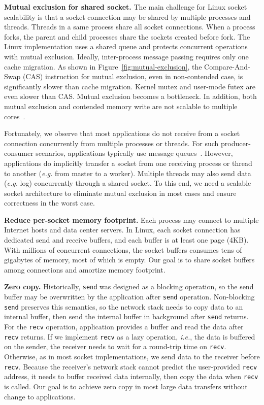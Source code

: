 \textbf{Mutual exclusion for shared socket.}
The main challenge for Linux socket scalability is that a socket connection may be shared by multiple processes and threads. Threads in a same process share all socket connections. When a process forks, the parent and child processes share the sockets created before fork. The Linux implementation uses a shared queue and protects concurrent operations with mutual exclusion.
Ideally, inter-process message passing requires only one cache migration. As shown in Figure~\ref{fig:mutual-exclusion}, the Compare-And-Swap (CAS) instruction for mutual exclusion, even in non-contended case, is significantly slower than cache migration. Kernel mutex and user-mode futex are even slower than CAS. Mutual exclusion becomes a bottleneck. In addition, both mutual exclusion and contended memory write are not scalable to multiple cores~\cite{boyd2014optimizing}.

Fortunately, we observe that most applications do not receive from a socket connection concurrently from multiple processes or threads. For such producer-consumer scenarios, applications typically use message queues~\cite{hintjens2013zeromq}. However, applications do implicitly transfer a socket from one receiving process or thread to another (\textit{e.g.} from master to a worker). Multiple threads may also send data (\textit{e.g.} log) concurrently through a shared socket.
To this end, we need a scalable socket architecture to eliminate mutual exclusion in most cases and ensure correctness in the worst case.


\textbf{Reduce per-socket memory footprint.}
Each process may connect to multiple Internet hosts and data center servers. In Linux, each socket connection has dedicated send and receive buffers, and each buffer is at least one page (4KB). With millions of concurrent connections, the socket buffers consumes tens of gigabytes of memory, most of which is empty. Our goal is to share socket buffers among connections and amortize memory footprint.


\textbf{Zero copy.}
Historically, \texttt{send} was designed as a blocking operation, so the send buffer may be overwritten by the application after \texttt{send} operation.
Non-blocking \texttt{send} preserves this semantics, so the network stack needs to copy data to an internal buffer, then send the internal buffer in background after \texttt{send} returns.
For the \texttt{recv} operation, application provides a buffer and read the data after \texttt{recv} returns.
If we implement \texttt{recv} as a lazy operation, \textit{i.e.}, the data is buffered on the sender, the receiver needs to wait for a round-trip time on \texttt{recv}.
Otherwise, as in most socket implementations, we send data to the receiver before \texttt{recv}. Because the receiver's network stack cannot predict the user-provided \texttt{recv} address, it needs to buffer received data internally, then copy the data when \texttt{recv} is called.
Our goal is to achieve zero copy in most large data transfers without change to applications.

